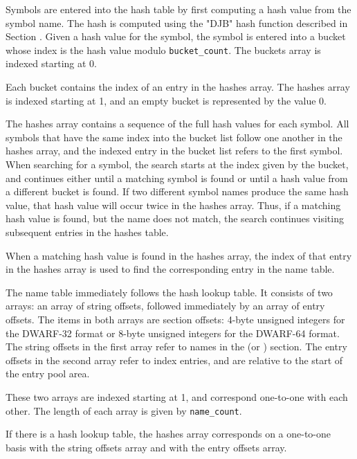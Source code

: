 Symbols are entered into the hash table by first computing a hash
value from the symbol name. The hash is computed 
using the "DJB" hash function 
described in Section .
Given a hash value for the symbol,
the symbol is entered into a bucket whose index is the hash value
modulo \texttt{bucket\_count}. The buckets array is indexed starting at 0.

Each bucket contains the index of an entry in the hashes array. The
hashes array is indexed starting at 1, and an empty bucket is
represented by the value 0.

The hashes array contains a sequence of the full hash values for each
symbol. All symbols that have the same index into the bucket list 
follow one another in the hashes array, and the indexed entry in 
the bucket list refers to the first symbol. 
When searching for a symbol, the search 
starts at the index given by the bucket, and continues either until a
matching symbol is found or until a hash value from a different bucket
is found. If two different symbol names produce the same hash value,
that hash value will occur twice in the hashes array. Thus, if a
matching hash value is found, but the name does not match, the search
continues visiting subsequent entries in the hashes table.

When a matching hash value is found in the hashes array, the index of
that entry in the hashes array is used to find the corresponding entry
in the name table.

\label{chap:nametable}
The name table immediately follows the hash lookup table. It
consists of two arrays: an array of string offsets, followed
immediately by an array of entry offsets. The items in both
arrays are section offsets: 4-byte unsigned integers for the
DWARF-32 format or 8-byte unsigned integers for the DWARF-64
format. The string offsets in the first array refer to names in
the \dotdebugstr{} (or \dotdebugstrdwo) section. The entry offsets
in the second array refer to index entries, and are relative to
the start of the entry pool area.

These two arrays are indexed starting at 1, and correspond 
one-to-one with each other. The length of each array is
given by \texttt{name\_count}.

If there is a hash lookup table, the hashes array corresponds on
a one-to-one basis with the string offsets array and with the
entry offsets array.

